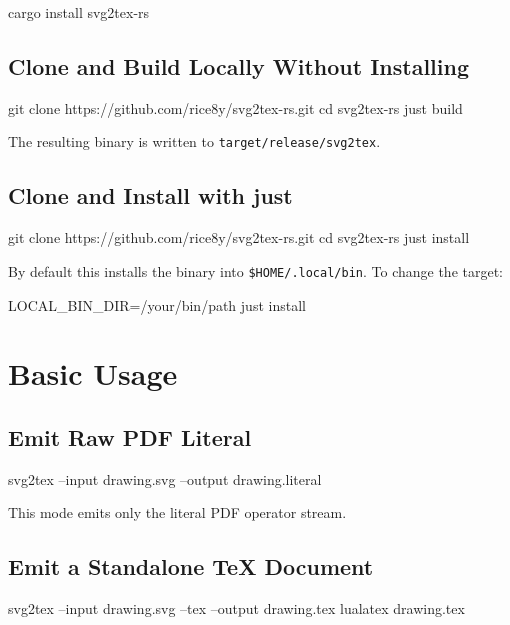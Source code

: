 \documentclass[11pt,a4paper]{article}
\begin{document}
\begin{codeblock}
cargo install svg2tex-rs
\end{codeblock}

\subsection{Clone and Build Locally Without Installing}

\begin{codeblock}
git clone https://github.com/rice8y/svg2tex-rs.git
cd svg2tex-rs
just build
\end{codeblock}

The resulting binary is written to \texttt{target/release/svg2tex}.

\subsection{Clone and Install with just}

\begin{codeblock}
git clone https://github.com/rice8y/svg2tex-rs.git
cd svg2tex-rs
just install
\end{codeblock}

By default this installs the binary into \texttt{\$HOME/.local/bin}. To change the target:

\begin{codeblock}
LOCAL_BIN_DIR=/your/bin/path just install
\end{codeblock}

\section{Basic Usage}

\subsection{Emit Raw PDF Literal}

\begin{codeblock}
svg2tex --input drawing.svg --output drawing.literal
\end{codeblock}

This mode emits only the literal PDF operator stream.

\subsection{Emit a Standalone TeX Document}

\begin{codeblock}
svg2tex --input drawing.svg --tex --output drawing.tex
lualatex drawing.tex
\end{codeblock}
\end{document}
